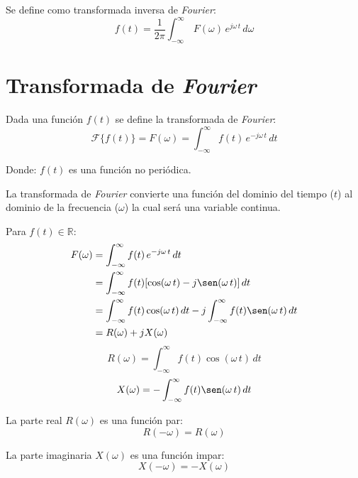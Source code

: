 Se define como transformada inversa de \emph{Fourier}:
\begin{equation}
    f(t)=\frac{1}{2\pi}\int_{-\infty}^\infty\,F(\omega)\,e^{j\omega\,t}\,d\omega
\end{equation}

\section{Transformada de \emph{Fourier}}
Dada una función $f(t)$ se define la transformada de \emph{Fourier}:
\begin{equation}
    \mathcal{F}\{f(t)\}=F(\omega)
        =\int_{-\infty}^{\infty}f(t)\,e^{-j\omega\,t}\,dt
\end{equation}

Donde: $f(t)$ es una función no periódica.

La transformada de \emph{Fourier} convierte una función del dominio del tiempo
($t$) al dominio de la frecuencia ($\omega$) la cual será una variable continua.

Para $f(t)\in\mathbb{R}$:
\begin{equation*}
\begin{split}
    F(\omega)
        &=\int_{-\infty}^{\infty}f(t)\,e^{-j\omega\,t}\,dt\\
        &=\int_{-\infty}^{\infty}f(t)[\cos(\omega\,t)-j\sen(\omega\,t)]\,dt\\
        &=\int_{-\infty}^{\infty}f(t)\cos(\omega\,t)\,dt
            -j\int_{-\infty}^{\infty}f(t)\sen(\omega\,t)\,dt\\
        &=R(\omega)+jX(\omega)\\
\end{split}
\end{equation*}
\begin{equation*}
    R(\omega)=\int_{-\infty}^{\infty}f(t)\cos(\omega\,t)\,dt
\end{equation*}
\begin{equation*}
    X(\omega)=-\int_{-\infty}^{\infty}f(t)\sen(\omega\,t)\,dt\\
\end{equation*}

La parte real $R(\omega)$ es una función par:
\begin{equation*}
    R(-\omega)=R(\omega)
\end{equation*}

La parte imaginaria $X(\omega)$ es una función impar:
\begin{equation*}
    X(-\omega)=-X(\omega)
\end{equation*}

